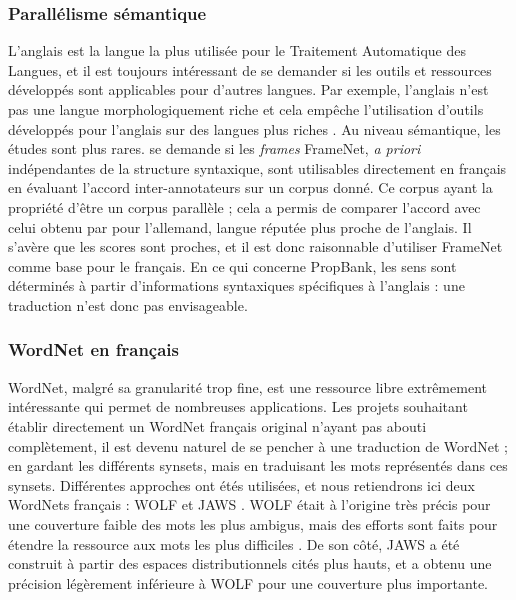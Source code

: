 \subsubsection{Parallélisme sémantique}

L'anglais est la langue la plus utilisée pour le Traitement Automatique des Langues, et il est toujours intéressant de se demander si les outils et ressources développés sont applicables pour d'autres langues. Par exemple, l'anglais n'est pas une langue morphologiquement riche et cela empêche l'utilisation d'outils développés pour l'anglais sur des langues plus riches \citep{tsarfaty2010statistical}. Au niveau sémantique, les études sont plus rares. \cite{pado2007annotation} se demande si les \textit{frames} FrameNet, \textit{a priori} indépendantes de la structure syntaxique, sont utilisables directement en français en évaluant l'accord inter-annotateurs sur un corpus donné. Ce corpus ayant la propriété d'être un corpus parallèle ; cela a permis de comparer l'accord avec celui obtenu par \cite{pado2006optimal} pour l'allemand, langue réputée plus proche de l'anglais. Il s'avère que les scores sont proches, et il est donc raisonnable d'utiliser FrameNet comme base pour le français. En ce qui concerne PropBank, les sens sont déterminés à partir d'informations syntaxiques spécifiques à l'anglais : une traduction n'est donc pas envisageable.

\subsubsection{WordNet en français}

WordNet, malgré sa granularité trop fine, est une ressource libre extrêmement intéressante qui permet de nombreuses applications. Les projets souhaitant établir directement un WordNet français original n'ayant pas abouti complètement, il est devenu naturel de se pencher à une traduction de WordNet ; en gardant les différents synsets, mais en traduisant les mots représentés dans ces synsets. Différentes approches ont étés utilisées, et nous retiendrons ici deux WordNets français : WOLF \cite{sagot2008construction} et JAWS \cite{mouton2010jaws}. WOLF était à l'origine très précis pour une couverture faible des mots les plus ambigus, mais des efforts sont faits pour étendre la ressource aux mots les plus difficiles \citep{sagot2012automatic}. De son côté, JAWS a été construit à partir des espaces distributionnels cités plus hauts, et a obtenu une précision légèrement inférieure à WOLF pour une couverture plus importante.

